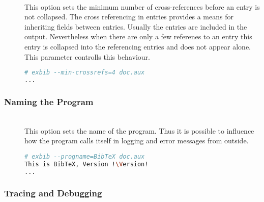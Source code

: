 \begin{description}
\item[ ]
\item[ ]
\item[ ] \ \\
  This option sets the minimum number of cross-references before an
  entry is not collapsed. The cross referencing in entries provides a
  means for inheriting fields between entries. Usually the entries are
  included in the output.  Nevertheless when there are only a few
  referenes to an entry this entry is collapsed into the referencing
  entries and does not appear alone. This parameter controlls this
  behaviour.
\begin{lstlisting}[language=sh]
# exbib --min-crossrefs=4 doc.aux
...
\end{lstlisting}

\end{description}

\subsubsection{Naming the Program}

\begin{description}
\item[ ]
\item[ ]
\item[ ]
\item[ ]\ \\
  This option sets the name of the program. Thus it is possible to
  influence how the program calls itself in logging and error messages
  from outside.
\begin{lstlisting}[language=sh,escapechar=!]
# exbib --progname=BibTeX doc.aux
This is BibTeX, Version !\Version!
...
\end{lstlisting}

\end{description}


\subsubsection{Tracing and Debugging}%
\label{sec:cli.debug}


